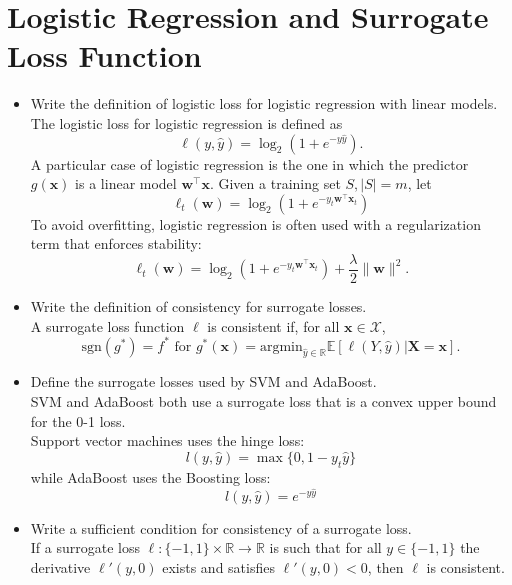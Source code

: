\newpage
\section{Logistic Regression and Surrogate Loss Function}

\begin{itemize}

    \item Write the definition of logistic loss for logistic regression with linear models.\\

        The logistic loss for logistic regression is defined as
        $$\ell(y, \hat{y}) = \log_2 (1+e^{-y\hat{y}}).$$
        A particular case of logistic regression is the one in which the predictor $g(\boldsymbol{x})$ is a linear model $\boldsymbol{w}^\top \boldsymbol{x}$. Given a training set $S, |S|=m$, let 
        $$\ell_t (\boldsymbol{w}) = \log_2 (1+e^{-y_t \boldsymbol{w}^\top \boldsymbol{x}_t})$$
        To avoid overfitting, logistic regression is often used with a regularization term that enforces stability:
        $$\ell_t (\boldsymbol{w}) = \log_2 (1+e^{-y_t \boldsymbol{w}^\top \boldsymbol{x}_t}) + \frac{\lambda}{2} \|\boldsymbol{w}\|^2.$$

  \item Write the definition of consistency for surrogate losses.\\

        A surrogate loss function $\ell$ is consistent if, for all $\boldsymbol{x} \in \mathcal{X}$,
        $$\text{sgn} (g^*) = f^* \text{ for } g^*(\boldsymbol{x}) = \text{argmin}_{\hat{y} \in \mathbb{R}} \mathbb{E}[\ell(Y,\hat{y})|\boldsymbol{X} = \boldsymbol{x}].$$

  \item Define the surrogate losses used by SVM and AdaBoost.\\

        SVM and AdaBoost both use a surrogate loss that is a convex upper bound for the 0-1 loss.\\
        Support vector machines uses the hinge loss: $$l(y, \hat{y}) = \max\{0, 1 - y_t \hat{y}\}$$ while AdaBoost uses the Boosting loss: $$l(y, \hat{y}) = e^{-y\hat{y}}$$

  \item Write a sufficient condition for consistency of a surrogate loss.\\

        If a surrogate loss $\ell:\{-1,1\} \times \mathbb{R} \to \mathbb{R}$ is such that for all $y \in \{-1,1\}$ the derivative $\ell'(y,0)$ exists and satisfies $\ell'(y,0) < 0$, then $\ell$ is consistent.


\end{itemize}
